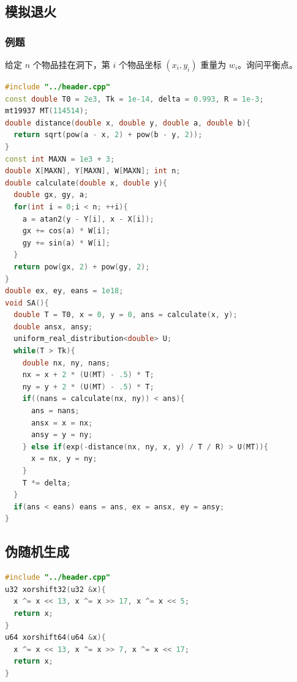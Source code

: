 \documentclass[10pt]{ctexart}
\begin{document}
\begin{multicols}{3}
    \subsection{模拟退火}\label{ux6a21ux62dfux9000ux706b}

    \subsubsection{例题}\label{ux4f8bux9898-7}

    给定 \(n\) 个物品挂在洞下，第 \(i\) 个物品坐标 \((x_i, y_i)\) 重量为
    \(w_i\)。询问平衡点。

\begin{lstlisting}[language={C++}]
#include "../header.cpp"
const double T0 = 2e3, Tk = 1e-14, delta = 0.993, R = 1e-3;
mt19937 MT(114514);
double distance(double x, double y, double a, double b){
  return sqrt(pow(a - x, 2) + pow(b - y, 2));
}
const int MAXN = 1e3 + 3;
double X[MAXN], Y[MAXN], W[MAXN]; int n;
double calculate(double x, double y){
  double gx, gy, a;
  for(int i = 0;i < n; ++i){
    a = atan2(y - Y[i], x - X[i]);
    gx += cos(a) * W[i];
    gy += sin(a) * W[i];
  }
  return pow(gx, 2) + pow(gy, 2);
}
double ex, ey, eans = 1e18;
void SA(){
  double T = T0, x = 0, y = 0, ans = calculate(x, y);
  double ansx, ansy;
  uniform_real_distribution<double> U;
  while(T > Tk){
    double nx, ny, nans;
    nx = x + 2 * (U(MT) - .5) * T;
    ny = y + 2 * (U(MT) - .5) * T;
    if((nans = calculate(nx, ny)) < ans){
      ans = nans;
      ansx = x = nx;
      ansy = y = ny;
    } else if(exp(-distance(nx, ny, x, y) / T / R) > U(MT)){
      x = nx, y = ny;
    }
    T *= delta;
  }
  if(ans < eans) eans = ans, ex = ansx, ey = ansy;
}
\end{lstlisting}

    \subsection{伪随机生成}\label{ux4f2aux968fux673aux751fux6210}

\begin{lstlisting}[language={C++}]
#include "../header.cpp"
u32 xorshift32(u32 &x){
  x ^= x << 13, x ^= x >> 17, x ^= x << 5;
  return x;
}
u64 xorshift64(u64 &x){
  x ^= x << 13, x ^= x >> 7, x ^= x << 17;
  return x;
}
\end{lstlisting}

\end{multicols}
\end{document}
